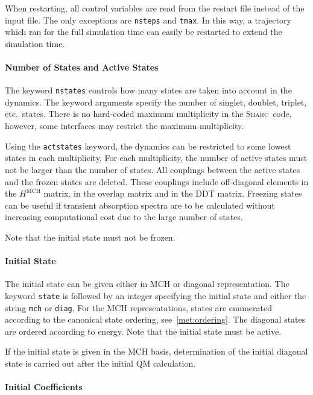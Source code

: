 \documentclass[a4paper,11pt,DIV=15,openany,twoside=false]{scrbook}
\newcommand{\sharc}{\textsc{Sharc}}
\newcommand{\ttt}[1]{\texttt{#1}}
\begin{document}
When restarting, all control variables are read from the restart file instead of the input file. The only exceptions are \ttt{nsteps} and \ttt{tmax}. In this way, a trajectory which ran for the full simulation time can easily be restarted to extend the simulation time.

\paragraph{Number of States and Active States}

The keyword \ttt{nstates} controls how many states are taken into account in the dynamics. The keyword arguments specify the number of singlet, doublet, triplet, etc.\ states. There is no hard-coded maximum multiplicity in the \sharc\ code, however, some interfaces may restrict the maximum multiplicity. 

Using the \ttt{actstates} keyword, the dynamics can be restricted to some lowest states in each multiplicity. For each multiplicity, the number of active states must not be larger than the number of states. All couplings between the active states and the frozen states are deleted. These couplings include off-diagonal elements in the $H^{\text{MCH}}$ matrix, in the overlap matrix and in the DDT matrix. Freezing states can be useful if transient absorption spectra are to be calculated without increasing computational cost due to the large number of states.

Note that the initial state must not be frozen.

\paragraph{Initial State}

The initial state can be given either in MCH or diagonal representation. The keyword \ttt{state} is followed by an integer specifying the initial state and either the string \ttt{mch} or \ttt{diag}. For the MCH representations, states are enumerated according to the canonical state ordering, see~\ref{met:ordering}. The diagonal states are ordered according to energy. Note that the initial state must be active. 

If the initial state is given in the MCH basis, determination of the initial diagonal state is carried out after the initial QM calculation.

\paragraph{Initial Coefficients}
\end{document}
